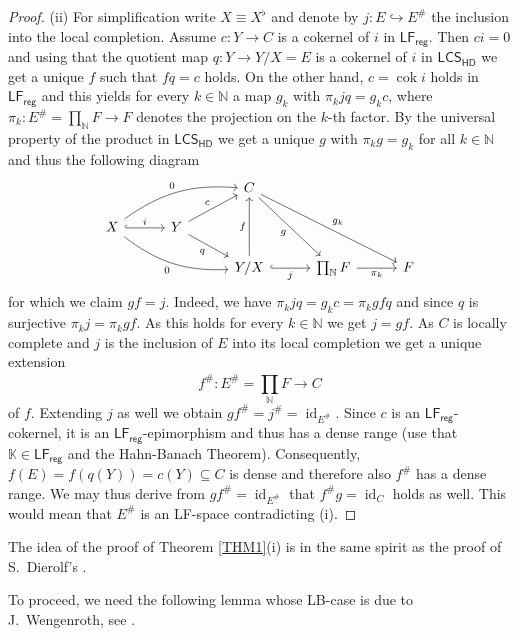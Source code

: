\documentclass[11pt, a4paper, reqno]{amsart}
\theoremstyle{definition}
\newcommand{\id}{\operatorname{id}\nolimits}
\newcommand{\Bigprod}[2]{\ensuremath{\mathop{\textstyle\prod}_{#1}^{#2}}}
\newcommand{\cok}{\operatorname{cok}\nolimits}
\newcommand{\NN}{\mathbb{N}}
\newcommand{\KK}{\mathbb{K}}
\newcommand{\HDLCS}{\mathsf{LCS}_{\mathsf{HD}}}
\newcommand{\LFr}{\mathsf{LF}_{\mathsf{reg}}}
\renewcommand{\sharp}{\texttt{\#}}
\begin{document}
\begin{proof}
(ii) For simplification write $X\equiv X^{\flat}$ and denote by $j\colon E\hookrightarrow E^{\sharp}$ the inclusion into the local completion. Assume $c\colon Y\rightarrow C$ is a cokernel of $i$ in $\LFr$. Then $ci=0$ and using that the quotient map $q\colon Y\rightarrow Y/X=E$ is a cokernel of $i$ in $\HDLCS$ we get a unique $f$ such that $fq=c$ holds. On the other hand, $c=\cok i$ holds in $\LFr$ and this yields for every $k\in\NN$ a map $g_k$ with $\pi_k j q=g_kc$, where $\pi_k\colon E^{\sharp}=\prod_{\NN}F\rightarrow F$ denotes the projection on the $k$-th factor. By the universal property of the product in $\HDLCS$ we get a unique $g$ with $\pi_k g=g_k$ for all $k\in\NN$ and thus the following diagram
\begin{equation*}
\begin{tikzcd}[column sep = 29pt, row sep = 14pt]
& & C \ar[rrdd,"g_k"]\ar[rdd,swap,"g"]\\
X\ar[r, hook, "i"]\ar[rru, bend left=20, "0"]\ar[rrd, bend right=20,swap, "0"] & Y\ar[ru,"c"]\ar[rd,swap, "q"] & \\
& & Y/X\ar[uu,"f"]\ar[r,hook, swap,"j"]&\prod_{\NN} F\ar[r,swap,"\pi_k"]&F
\end{tikzcd}
\end{equation*}
for which we claim $gf=j$. Indeed, we have $\pi_kjq=g_kc=\pi_kgfq$ and since $q$ is surjective $\pi_kj=\pi_kgf$. As this holds for every $k\in\NN$ we get $j=gf$. As $C$ is locally complete and $j$ is the inclusion of $E$ into its local completion we get a unique extension
$$
f^{\sharp}\colon E^{\sharp}=\Bigprod{\NN}{}F\longrightarrow C
$$
of $f$. Extending $j$ as well we obtain $gf^{\sharp}=j^{\sharp}=\id_{E^{\sharp}}$. Since $c$ is an $\LFr$-cokernel, it is an $\LFr$-epimorphism and thus has a dense range (use that $\KK\in\LFr$ and the Hahn-Banach Theorem). Consequently, $f(E)=f(q(Y))=c(Y)\subseteq C$ is dense and  therefore also $f^{\sharp}$ has a dense range. We may thus derive from $gf^{\sharp}=\id_{E^{\sharp}}$ that $f^{\sharp}g=\id_{C}$ holds as well. This would mean that $E^{\sharp}$ is an LF-space contradicting (i).
\end{proof}

The idea of the proof of Theorem \ref{THM1}(i) is in the same spirit as the proof of S.~Dierolf's \cite[Proposition in Section II]{Die81}.

\smallskip

To proceed, we need the following lemma whose LB-case is due to J.~Wengenroth, see \cite[Lem 4.12]{W25}.
\end{document}
